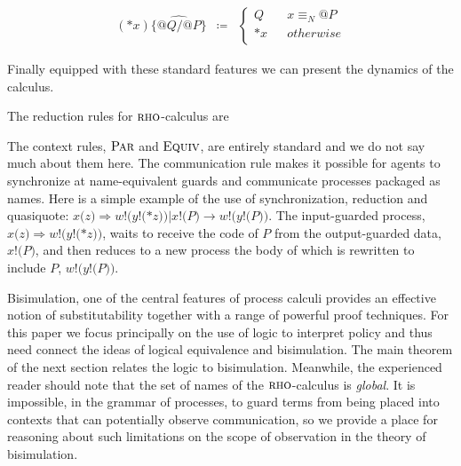 \documentclass[submission,copyright,creativecommons]{eptcs}
\makeatletter
\newcommand{\id}[1]{\texttt{#1}}
\newcommand{\juxtap}{\mathbin{\id{|}}}
\newcommand{\concat}{\Rightarrow}
\newcommand{\scong}{\mathbin{\equiv}}
\newcommand{\nameeq}{\mathbin{\equiv_N}}
\newcommand{\quotep}[1]{@#1}
\newcommand{\dropn}[1]{*#1}
\newcommand{\substp}[2]{\id{\{} \quotep{#1} / \quotep{#2} \id{\}}}
\newcommand{\psubstp}[2]{\widehat{\substp{#1}{#2}}}
\newcommand{\defneqls}{\coloneqq}
\newcommand{\red}{\rightarrow}
\numberwithin{equation}{subsection}
\newcommand{\rhoc}{${\textsc{rho}}$-calculus}
\makeatother
\begin{document}
\begin{eqnarray*}
(\dropn{x})  \psubstp{Q}{P}       
		& \defneqls & 
		\left\{ 
			\begin{array}{ccc} 
				Q & & x \nameeq \quotep{P} \\
                              	\dropn{x} & & otherwise \\
			\end{array}
		\right.
\end{eqnarray*}

Finally equipped with these standard features we can present the
dynamics of the calculus.

The reduction rules for {\rhoc}  are

The context rules, $\textsc{Par}$ and $\textsc{Equiv}$, are entirely standard and we do
not say much about them here. The communication rule makes it possible
for agents to synchronize at name-equivalent guards and communicate
processes packaged as names. Here is a simple example of the use of
synchronization, reduction and quasiquote: $x{(}{z}{)} \Rightarrow
{w}{!}{(}{y}{!}{(}{*}{z}{)}{)} \juxtap x{!}{(}{P}{)} \red
{w}{!}{(}{y}{!}{(}P{)}{)}$. The input-guarded process, $x{(}{z}{)}
\Rightarrow {w}{!}{(}{y}{!}{(}{*}{z}{)}{)}$, waits to receive the code
of $P$ from the output-guarded data, $x{!}{(}{P}{)}$, and then reduces
to a new process the body of which is rewritten to include $P$,
${w}{!}{(}{y}{!}{(}P{)}{)}$.

Bisimulation, one of the central features of process calculi provides
an effective notion of substitutability together with a range of
powerful proof techniques. For this paper we focus principally on the
use of logic to interpret policy and thus need connect the ideas of
logical equivalence and bisimulation. The main theorem of the next
section relates the logic to bisimulation. Meanwhile, the experienced
reader should note that the set of names of the {\rhoc} is
\textit{global}. It is impossible, in the grammar of processes, to
guard terms from being placed into contexts that can potentially
observe communication, so we provide a place for reasoning about such
limitations on the scope of observation in the theory of bisimulation.
\end{document}
